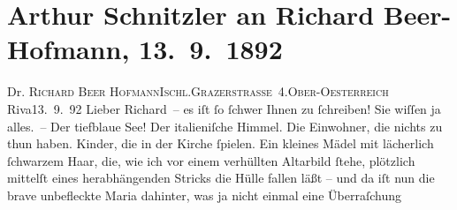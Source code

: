 

         
         \renewcommand{\erwaehntePersonen}{Personen: Richard Beer-Hofmann}
         \renewcommand{\erwaehnteOrte}{Orte: Bad Ischl, Grazer Straße, Italien, Lago di Garda, Riva del Garda}
         \renewcommand{\erwaehnteWerke}{}
               \section[Arthur Schnitzler an Richard Beer-Hofmann, 13. 9. 1892]{ Arthur Schnitzler an Richard Beer-Hofmann, 13. 9. 1892}\nopagebreak{}\rehead{ }\begin{ledgroupsized}[t]{13cm}\normalsize\beginnumbering \toendnotes[C]{\smallbreak\pagebreak[2]} 
\toendnotes[C]{\smallbreak}\pstart{}{\pb}Dr. \textsc{Richard Beer Hofmann}\pend{}\pstart{}\textsc{Ischl.}\pend{}\pstart{}\textsc{Grazerstraße 4}.\pend{}\pstart{}\textsc{Ober-Oesterreich}\pend{}{\bigskip}\pstart
           \raggedleft{}{\pb}Riva13. 9. 92\pend
           \pstart
           Lieber Richard – es iſt ſo ſchwer Ihnen zu ſchreiben! Sie wiſſen ja
               alles. – Der tiefblaue See!
               Der italieniſche Himmel. Die Einwohner, die
               nichts zu thun haben. Kinder, die in der Kirche ſpielen. Ein kleines Mädel mit
               lächerlich ſchwarzem Haar, die, wie ich vor einem verhüllten Altarbild ſtehe,
               plötzlich mittelſt eines herabhängenden Stricks die Hülle fallen läßt – und da iſt
               nun die brave unbefleckte Maria dahinter, was ja nicht einmal eine Überraſchung

\end{ledgroupsized}
